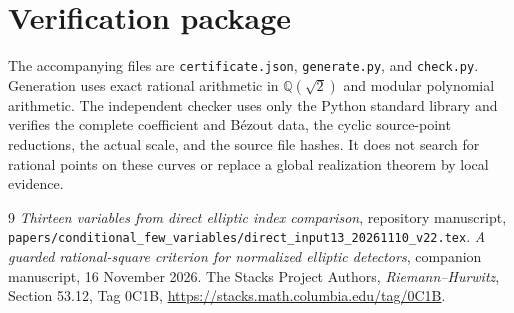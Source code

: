 \documentclass[11pt,a4paper]{article}
\newcommand{\Q}{\mathbb Q}
\begin{document}
\section{Verification package}
The accompanying files are \nolinkurl{certificate.json},
\nolinkurl{generate.py}, and \nolinkurl{check.py}. Generation uses
exact rational arithmetic in $\Q(\sqrt2)$ and modular polynomial
arithmetic. The independent checker uses only the Python standard
library and verifies the complete coefficient and B\'ezout data,
the cyclic source-point reductions, the actual scale, and the source
file hashes. It does not search for rational points on these curves
or replace a global realization theorem by local evidence.

\begin{thebibliography}{9}
\emph{Thirteen variables from direct elliptic index
comparison}, repository manuscript,
\nolinkurl{papers/conditional_few_variables/direct_input13_20261110_v22.tex}.
\emph{A guarded rational-square criterion for
normalized elliptic detectors}, companion manuscript, 16 November 2026.
 The Stacks Project Authors, \emph{Riemann--Hurwitz},
Section 53.12, Tag 0C1B,
\url{https://stacks.math.columbia.edu/tag/0C1B}.
\end{thebibliography}
\end{document}
